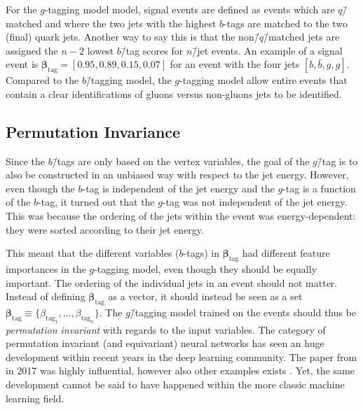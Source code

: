 For the $g$-tagging model model, signal events are defined as events which are $q$\=/matched and where the two jets with the highest $b$-tags are matched to the two (final) quark jets. Another way to say this is that the non\=/$q$\=/matched jets are assigned the $n-2$ lowest $b$\=/tag scores for $n$\=/jet events. An example of a signal event is $\bm{\beta}_\mathrm{tag}=[0.95, 0.89, 0.15, 0.07]$ for an event with the four jets $[b, \bar{b}, g, g]$. Compared to the $b$\=/tagging model, the $g$-tagging model allow entire events that contain a clear identifications of gluons versus non-gluons jets to be identified.

\subsection{Permutation Invariance}
\label{subsec:q:permutation_invariance}

Since the $b$\=/tags are only based on the vertex variables, the goal of the $g$\=/tag is to also be constructed in an unbiased way with respect to the jet energy. However, even though the $b$-tag is independent of the jet energy and the $g$-tag is a function of the $b$-tag, it turned out that the $g$-tag was not independent of the jet energy. This was because the ordering of the jets within the event was energy-dependent: they were sorted according to their jet energy. 

This meant that the different variables ($b$-tags) in $\bm{\beta}_\mathrm{tag}$ had different feature importances in the $g$-tagging model, even though they should be equally important. The ordering of the individual jets in an event should not matter. Instead of defining $\bm{\beta}_\mathrm{tag}$ as a vector, it should instead be seen as a set $\bm{\beta}_\mathrm{tag} \equiv \{\beta_{\mathrm{tag}_1}, \dots, \beta_{\mathrm{tag}_n}\}$. The $g$\=/tagging model trained on the events should thus be \emph{permutation invariant} with regards to the input variables. The category of permutation invariant (and equivariant) neural networks has seen an huge development within recent years in the deep learning community. The paper from \citet{zaheerDeepSets2017} in \num{2017} was highly influential, however also other examples exists \autocite{ravanbakhshDeepLearningSets2017, guttenbergPermutationequivariantNeuralNetworks2016}. Yet, the same development cannot be said to have happened within the more classic machine learning field.

